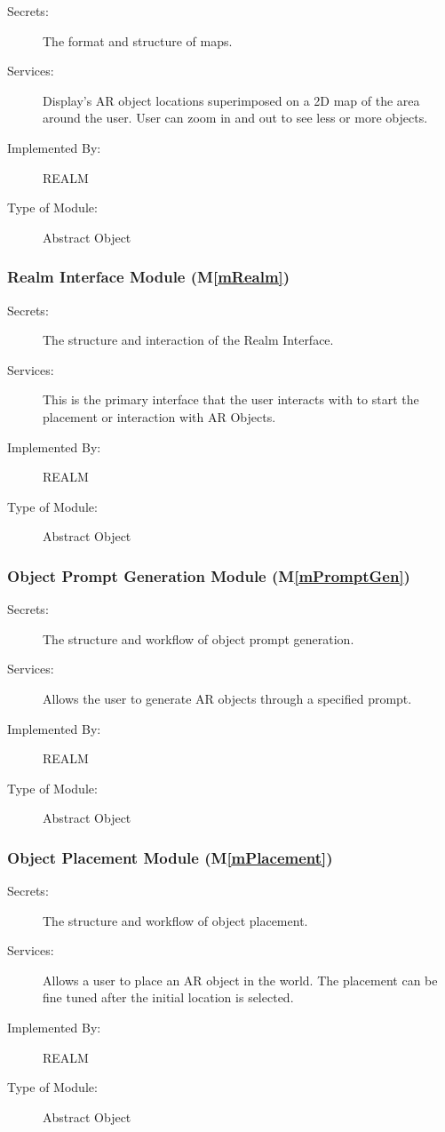 \documentclass[12pt, titlepage]{article}
\newcommand{\mref}[1]{M\ref{#1}}
\begin{document}
\begin{description}
\item[Secrets:]The format and structure of maps.
\item[Services:]Display's AR object locations superimposed on a 2D map of the area around the user. User can zoom in and out to see less or more objects.
\item[Implemented By:]REALM
\item[Type of Module:]Abstract Object
\end{description}

\subsubsection{Realm Interface Module (\mref{mRealm})}

\begin{description}
\item[Secrets:]The structure and interaction of the Realm Interface.
\item[Services:]This is the primary interface that the user interacts with to start the placement or interaction with AR Objects.
\item[Implemented By:]REALM
\item[Type of Module:]Abstract Object
\end{description}

\subsubsection{Object Prompt Generation Module (\mref{mPromptGen})}

\begin{description}
\item[Secrets:]The structure and workflow of object prompt generation.
\item[Services:]Allows the user to generate AR objects through a specified prompt.
\item[Implemented By:]REALM
\item[Type of Module:]Abstract Object
\end{description}

\subsubsection{Object Placement Module (\mref{mPlacement})}

\begin{description}
\item[Secrets:]The structure and workflow of object placement.
\item[Services:]Allows a user to place an AR object in the world. The placement can be fine tuned after the initial location is selected.
\item[Implemented By:]REALM
\item[Type of Module:]Abstract Object
\end{description}
\end{document}
